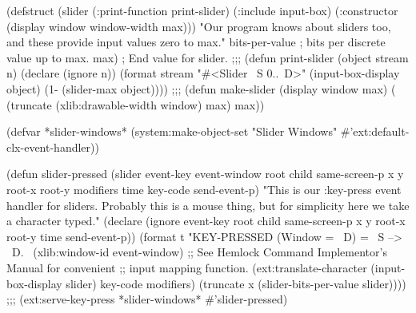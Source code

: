 \begin{lisp}
(defstruct (slider (:print-function print-slider)
                   (:include input-box)
                   (:constructor %
                                    (display window window-width max)))
  "Our program knows about sliders too, and these provide input values
   zero to max."
  bits-per-value  ; bits per discrete value up to max.
  max)            ; End value for slider.
;;;
(defun print-slider (object stream n)
  (declare (ignore n))
  (format stream "#<Slider ~S  0..~D>"
          (input-box-display object)
          (1- (slider-max object))))
;;;
(defun make-slider (display window max)
  (%
                  (truncate (xlib:drawable-width window) max)
                max))

(defvar *slider-windows*
        (system:make-object-set "Slider Windows"
                                #'ext:default-clx-event-handler))

(defun slider-pressed (slider event-key event-window root child
                       same-screen-p x y root-x root-y modifiers time
                       key-code send-event-p)
  "This is our :key-press event handler for sliders.  Probably this is
   a mouse thing, but for simplicity here we take a character typed."
  (declare (ignore event-key root child same-screen-p x y
                   root-x root-y time send-event-p))
  (format t "KEY-PRESSED (Window = ~D) = ~S  -->  ~D.~%
          (xlib:window-id event-window)
          ;; See Hemlock Command Implementor's Manual for convenient
          ;; input mapping function.
          (ext:translate-character (input-box-display slider)
                                     key-code modifiers)
          (truncate x (slider-bits-per-value slider))))
;;;
(ext:serve-key-press *slider-windows* #'slider-pressed)
\end{lisp}

